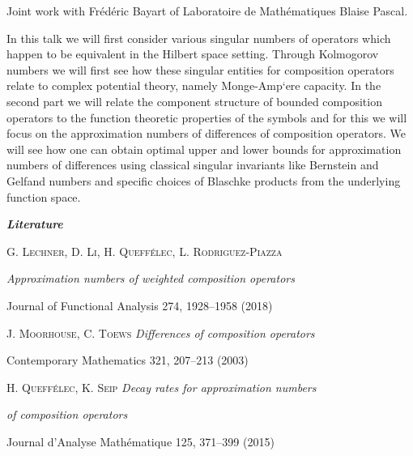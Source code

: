 {
    Joint work with Frédéric Bayart of Laboratoire de Mathématiques Blaise Pascal.

    In this talk we will first consider various singular numbers of operators
    which happen to be equivalent in the Hilbert space setting. Through
    Kolmogorov numbers we will first see how these singular entities for
    composition operators relate to complex potential theory, namely
    Monge-Amp`ere capacity. In the second part we will relate the component
    structure of bounded composition operators to the function theoretic
    properties of the symbols and for this we will focus on the approximation
    numbers of differences of composition operators. We will see how one can
    obtain optimal upper and lower bounds for approximation numbers of
    differences using classical singular invariants like Bernstein and
    Gelfand numbers and specific choices of Blaschke products from the
    underlying function space.

    \bigskip
    \noindent
    \textit{\textbf{\large Literature}}

    \medskip
    \noindent
    \textsc{G. Lechner, D. Li, H. Queffélec, L. Rodriguez-Piazza}
    
    \hfill \textit{Approximation numbers of weighted composition operators}

    \hfill Journal of Functional Analysis 274, 1928–1958 (2018)

    \smallskip
    \noindent
    \textsc{J. Moorhouse, C. Toews}
    \hfill \textit{Differences of composition operators}

    \hfill Contemporary Mathematics 321, 207–213 (2003)

    \smallskip
    \noindent
    \textsc{H. Queffélec, K. Seip}
    \hfill \textit{Decay rates for approximation numbers}

    \hfill \textit{of composition operators}

    \hfill Journal d’Analyse Mathématique 125, 371–399 (2015)%
}
